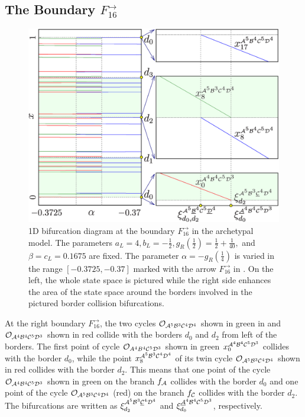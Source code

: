 \subsection{The Boundary $F_{16}^\rightarrow$}
\label{sec:arch.bif.R}

\begin{figure}
	\centering
	\includegraphics[width=.7 \textwidth]{../Figures/6/6.7/result.png}
	\caption[1D bifurcation diagram at the boundary $F_{16}^\rightarrow$ in the archetypal model]{
		1D bifurcation diagram at the boundary $F_{16}^\rightarrow$ in the archetypal model.
		The parameters $a_L = 4, b_L = -\frac{1}{2}, g_R\left(\frac{1}{2}\right) = \frac{1}{2} + \frac{1}{40},$ and $\beta = c_L = 0.1675$ are fixed.
		The parameter $\alpha = -g_R\left(\frac{1}{4}\right)$ is varied in the range $[-0.3725, -0.37]$ marked with the arrow $F_{16}^\rightarrow$ in .
		On the left, the whole state space is pictured while the right side enhances the area of the state space around the borders involved in the pictured border collision bifurcations.
	}
	\label{fig:arch.bif.F.right}
\end{figure}

At the right boundary $F_{16}^\rightarrow$, the two cycles $\mathcal{O}_{\mathcal{A}^5\mathcal{B}^3\mathcal{C}^4\mathcal{D}^4}$ shown in green in  and $\mathcal{O}_{\mathcal{A}^4\mathcal{B}^4\mathcal{C}^5\mathcal{D}^3}$ shown in red collide with the borders $d_0$ and $d_2$ from left of the borders.
The first point of cycle $\mathcal{O}_{A^4B^4\mathcal{C}^5\mathcal{D}^3}$ shown in green $x_{0}^{\mathcal{A}^4\mathcal{B}^4\mathcal{C}^5\mathcal{D}^3}$ collides with the border $d_0$, while the point $x_{8}^{\mathcal{A}^5\mathcal{B}^3\mathcal{C}^4\mathcal{D}^4}$ of its twin cycle $\mathcal{O}_{\mathcal{A}^5\mathcal{B}^3\mathcal{C}^4\mathcal{D}^4}$ shown in red collides with the border $d_2$.
This means that one point of the cycle $\mathcal{O}_{\mathcal{A}^4\mathcal{B}^4\mathcal{C}^5\mathcal{D}^3}$ shown in green on the branch $f_{\mathcal{A}}$ collides with the border $d_0$ and one point of the cycle $\mathcal{O}_{\mathcal{A}^5\mathcal{B}^3\mathcal{C}^4\mathcal{D}^4}$ (red) on the branch $f_{\mathcal{C}}$ collides with the border $d_2$.
The bifurcations are written as $\xi_{d_2}^{\mathcal{A}^5\mathcal{B}^3\underline{\mathcal{C}}^4\mathcal{D}^4}$ and $\xi_{d_0}^{\underline{\mathcal{A}}^4\mathcal{B}^4\mathcal{C}^5\mathcal{D}^3}$, respectively.

